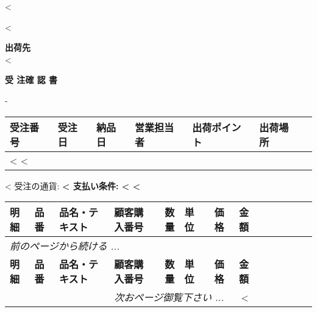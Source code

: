 <%

\begin{CJK}{UTF8}{arialuni}

\vspace*{-3.3cm}
<%
\vspace*{0.5cm}

\parbox[t]{.80\textwidth}{
\textbf{出荷先} \\
<%
}

\vspace{1.2cm}

\centerline{\large\bf{受 注}\hspace{5mm}確 認 書}
\normalsize

\vspace{0.5cm}
-
\vspace{0.2cm}

\begin{tabularx}{\textwidth}{*{7}{|X}|} \hline
  \textbf{受注番号} & \textbf{受注日} & \textbf{納品日} & \textbf{営業担当者}
  & \textbf{出荷ポイント} & \textbf{出荷場所} \\ [0.5em]
  \hline
  <%
  <%
  \hline
\end{tabularx}

\parbox{\textwidth}{
\vspace{0.5cm}
<%
	受注の通貨: \textbf{<%
   支払い条件: <%
<%
}

\vspace{0.5cm}

\begin{longtable}{|ll p{4.5cm} @{\extracolsep\fill} lrlrr|} \hline
  \textbf{明細} & \textbf{品番} & \textbf{品名・テキスト} & \textbf{顧客購入番号} & 
	\textbf{数量} & \textbf{単位}  & \textbf{価格} & \textbf{金額} \\     
  \hline
\endfirsthead
  \multicolumn{7}{l}{\emph{前のページから続ける ...}} \\
  \hline
  \textbf{明細} & \textbf{品番} & \textbf{品名・テキスト} & \textbf{顧客購入番号} & 
	\textbf{数量} & \textbf{単位}  & \textbf{価格} & \textbf{金額} \\     
  \hline
\endhead
   \hline \multicolumn{7}{r}{\emph{次おページ御覧下さい ...}}
\endfoot
   \hline
   \multicolumn{7}{|r} \textbf{合計} & <%


\end{longtable}}
\end{CJK}
